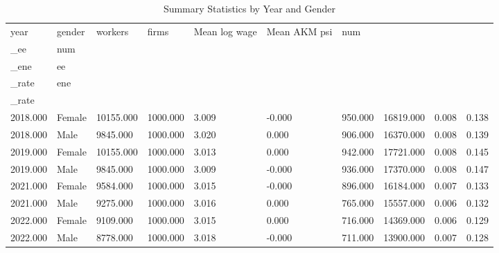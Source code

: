 \begin{table}[!htbp]\centering
\caption{Summary Statistics by Year and Gender}
\begin{tabular}{llllllllll}
\hline
year & gender & workers & firms & Mean log wage & Mean AKM psi & num\\_ee & num\\_ene & ee\\_rate & ene\\_rate
\\ \hline
2018.000 & Female & 10155.000 & 1000.000 & 3.009 & -0.000 & 950.000 & 16819.000 & 0.008 & 0.138 \\
2018.000 & Male & 9845.000 & 1000.000 & 3.020 & 0.000 & 906.000 & 16370.000 & 0.008 & 0.139 \\
2019.000 & Female & 10155.000 & 1000.000 & 3.013 & 0.000 & 942.000 & 17721.000 & 0.008 & 0.145 \\
2019.000 & Male & 9845.000 & 1000.000 & 3.009 & -0.000 & 936.000 & 17370.000 & 0.008 & 0.147 \\
2021.000 & Female & 9584.000 & 1000.000 & 3.015 & -0.000 & 896.000 & 16184.000 & 0.007 & 0.133 \\
2021.000 & Male & 9275.000 & 1000.000 & 3.016 & 0.000 & 765.000 & 15557.000 & 0.006 & 0.132 \\
2022.000 & Female & 9109.000 & 1000.000 & 3.015 & 0.000 & 716.000 & 14369.000 & 0.006 & 0.129 \\
2022.000 & Male & 8778.000 & 1000.000 & 3.018 & -0.000 & 711.000 & 13900.000 & 0.007 & 0.128 \\
\hline
\end{tabular}
\end{table}
